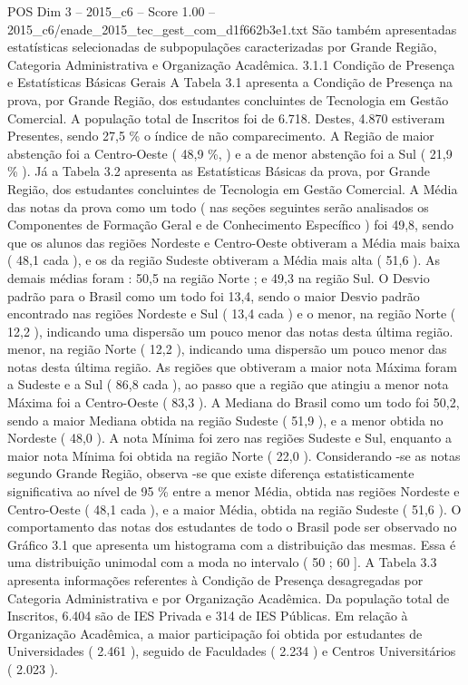 \begin{textsample}{POS Dim 3 – 2015\_c6 – Score 1.00 – 2015\_c6/enade\_2015\_tec\_gest\_com\_d1f662b3e1.txt}
São também apresentadas estatísticas selecionadas de subpopulações caracterizadas por Grande Região, Categoria Administrativa e Organização Acadêmica. 3.1.1 Condição de Presença e Estatísticas Básicas Gerais A Tabela 3.1 apresenta a Condição de Presença na prova, por Grande Região, dos estudantes concluintes de Tecnologia em Gestão Comercial.
A população total de Inscritos foi de 6.718.
Destes, 4.870 estiveram Presentes, sendo 27,5 \% o índice de não comparecimento.
A Região de maior abstenção foi a Centro-Oeste ( 48,9 \%, ) e a de menor abstenção foi a Sul ( 21,9 \% ).
Já a Tabela 3.2 apresenta as Estatísticas Básicas da prova, por Grande Região, dos estudantes concluintes de Tecnologia em Gestão Comercial.
A Média das notas da prova como um todo ( nas seções seguintes serão analisados os Componentes de Formação Geral e de Conhecimento Específico ) foi 49,8, sendo que os alunos das regiões Nordeste e Centro-Oeste obtiveram a Média mais baixa ( 48,1 cada ), e os da região Sudeste obtiveram a Média mais alta ( 51,6 ).
As demais médias foram : 50,5 na região Norte ; e 49,3 na região Sul.
O Desvio padrão para o Brasil como um todo foi 13,4, sendo o maior Desvio padrão encontrado nas regiões Nordeste e Sul ( 13,4 cada ) e o menor, na região Norte ( 12,2 ), indicando uma dispersão um pouco menor das notas desta última região. menor, na região Norte ( 12,2 ), indicando uma dispersão um pouco menor das notas desta última região.
As regiões que obtiveram a maior nota Máxima foram a Sudeste e a Sul ( 86,8 cada ), ao passo que a região que atingiu a menor nota Máxima foi a Centro-Oeste ( 83,3 ).
A Mediana do Brasil como um todo foi 50,2, sendo a maior Mediana obtida na região Sudeste ( 51,9 ), e a menor obtida no Nordeste ( 48,0 ).
A nota Mínima foi zero nas regiões Sudeste e Sul, enquanto a maior nota Mínima foi obtida na região Norte ( 22,0 ).
Considerando -se as notas segundo Grande Região, observa -se que existe diferença estatisticamente significativa ao nível de 95 \% entre a menor Média, obtida nas regiões Nordeste e Centro-Oeste ( 48,1 cada ), e a maior Média, obtida na região Sudeste ( 51,6 ).
O comportamento das notas dos estudantes de todo o Brasil pode ser observado no Gráfico 3.1 que apresenta um histograma com a distribuição das mesmas.
Essa é uma distribuição unimodal com a moda no intervalo ( 50 ; 60 ].
A Tabela 3.3 apresenta informações referentes à Condição de Presença desagregadas por Categoria Administrativa e por Organização Acadêmica.
Da população total de Inscritos, 6.404 são de IES Privada e 314 de IES Públicas.
Em relação à Organização Acadêmica, a maior participação foi obtida por estudantes de Universidades ( 2.461 ), seguido de Faculdades ( 2.234 ) e Centros Universitários ( 2.023 ).

\end{textsample}
